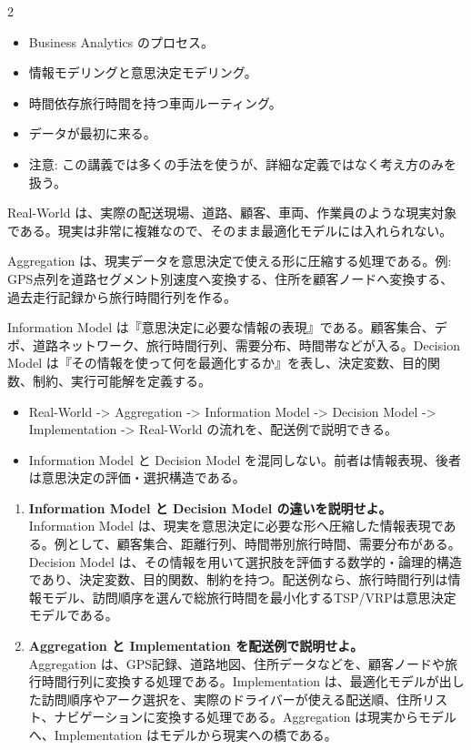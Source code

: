 \clearpage
{}
\begin{multicols}{2}\footnotesize\raggedcolumns
{}
\begin{itemize}
\item Business Analytics のプロセス。
\item 情報モデリングと意思決定モデリング。
\item 時間依存旅行時間を持つ車両ルーティング。
\item データが最初に来る。
\item 注意: この講義では多くの手法を使うが、詳細な定義ではなく考え方のみを扱う。
\end{itemize}
Real-World は、実際の配送現場、道路、顧客、車両、作業員のような現実対象である。現実は非常に複雑なので、そのまま最適化モデルには入れられない。\par

Aggregation は、現実データを意思決定で使える形に圧縮する処理である。例: GPS点列を道路セグメント別速度へ変換する、住所を顧客ノードへ変換する、過去走行記録から旅行時間行列を作る。\par

Information Model は『意思決定に必要な情報の表現』である。顧客集合、デポ、道路ネットワーク、旅行時間行列、需要分布、時間帯などが入る。Decision Model は『その情報を使って何を最適化するか』を表し、決定変数、目的関数、制約、実行可能解を定義する。\par
{}
\begin{itemize}
\item Real-World -> Aggregation -> Information Model -> Decision Model -> Implementation -> Real-World の流れを、配送例で説明できる。
\item Information Model と Decision Model を混同しない。前者は情報表現、後者は意思決定の評価・選択構造である。
\end{itemize}
\begin{enumerate}
\item \textbf{Information Model と Decision Model の違いを説明せよ。}\\Information Model は、現実を意思決定に必要な形へ圧縮した情報表現である。例として、顧客集合、距離行列、時間帯別旅行時間、需要分布がある。Decision Model は、その情報を用いて選択肢を評価する数学的・論理的構造であり、決定変数、目的関数、制約を持つ。配送例なら、旅行時間行列は情報モデル、訪問順序を選んで総旅行時間を最小化するTSP/VRPは意思決定モデルである。
\item \textbf{Aggregation と Implementation を配送例で説明せよ。}\\Aggregation は、GPS記録、道路地図、住所データなどを、顧客ノードや旅行時間行列に変換する処理である。Implementation は、最適化モデルが出した訪問順序やアーク選択を、実際のドライバーが使える配送順、住所リスト、ナビゲーションに変換する処理である。Aggregation は現実からモデルへ、Implementation はモデルから現実への橋である。
\end{enumerate}
\end{multicols}

